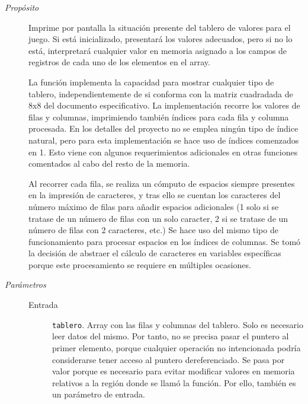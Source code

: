 \documentclass[12pt]{article}
\begin{document}
\begin{description}

\item[\emph{Propósito}]

Imprime por pantalla la situación presente del tablero de valores para el juego.
Si está inicializado, presentará los valores adecuados, pero si no lo está,
interpretará cualquier valor en memoria asignado a los campos de registros de
cada uno de los elementos en el array.

La función implementa la capacidad para mostrar cualquier tipo de tablero,
independientemente de si conforma con la matriz cuadradada de 8x8 del documento
especificativo. La implementación recorre los valores de filas y columnas,
imprimiendo también índices para cada fila y columna procesada. En los detalles
del proyecto no se emplea ningún tipo de índice natural, pero para esta
implementación se hace uso de índices comenzados en 1. Esto viene con algunos
requerimientos adicionales en otras funciones comentados al cabo del resto de la
memoria.

Al recorrer cada fila, se realiza un cómputo de espacios siempre presentes en la
impresión de caracteres, y tras ello se cuentan los caracteres del número
máximo de filas para añadir espacios adicionales (1 solo si se tratase de un
número de filas con un solo caracter, 2 si se tratase de un número de filas con
2 caracteres, etc.) Se hace uso del mismo tipo de funcionamiento para procesar
espacios en los índices de columnas. Se tomó la decisión de abstraer el cálculo
de caracteres en variables específicas porque este procesamiento se requiere en
múltiples ocasiones.

\item[\emph{Parámetros}] \leavevmode

\begin{description}

\item[Entrada] \texttt{tablero}. Array con las filas y columnas del
tablero. Solo es necesario leer datos del mismo. Por tanto, no se precisa pasar
el puntero al primer elemento, porque cualquier operación no intencionada podría
considerarse tener acceso al puntero dereferenciado. Se pasa por valor porque es
necesario para evitar modificar valores en memoria relativos a la región donde
se llamó la función. Por ello, también es un parámetro de entrada.

\end{description}

\end{description}
\end{document}
